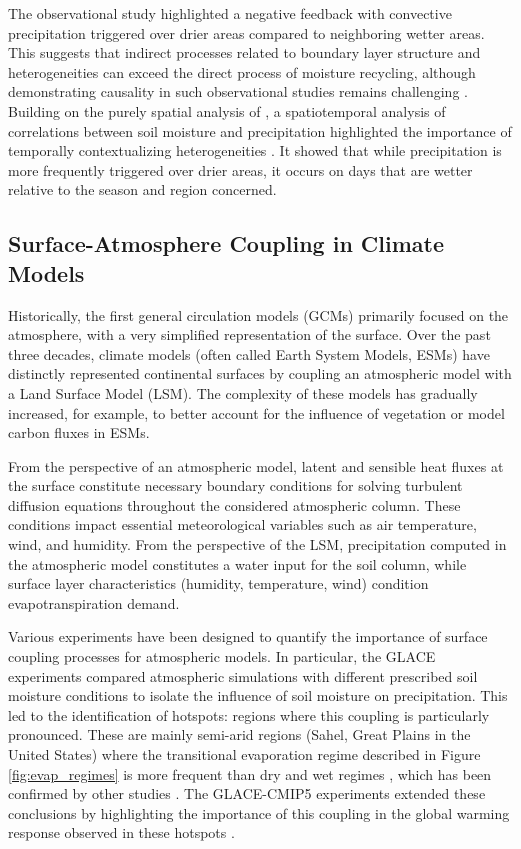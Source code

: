 The observational study \cite{taylor_afternoon_2012} highlighted a negative feedback with convective precipitation triggered over drier areas compared to neighboring wetter areas. This suggests that indirect processes related to boundary layer structure and heterogeneities can exceed the direct process of moisture recycling, although demonstrating causality in such observational studies remains challenging \cite{salvucci_investigating_2002, guillod_land-surface_2014}. Building on the purely spatial analysis of \cite{taylor_afternoon_2012}, a spatiotemporal analysis of correlations between soil moisture and precipitation highlighted the importance of temporally contextualizing heterogeneities \cite{guillod_reconciling_2015}. It showed that while precipitation is more frequently triggered over drier areas, it occurs on days that are wetter relative to the season and region concerned.

\subsection{Surface-Atmosphere Coupling in Climate Models}

Historically, the first general circulation models (GCMs) primarily focused on the atmosphere, with a very simplified representation of the surface. Over the past three decades, climate models (often called Earth System Models, ESMs) have distinctly represented continental surfaces by coupling an atmospheric model with a Land Surface Model (LSM). The complexity of these models has gradually increased, for example, to better account for the influence of vegetation or model carbon fluxes in ESMs.

From the perspective of an atmospheric model, latent and sensible heat fluxes at the surface constitute necessary boundary conditions for solving turbulent diffusion equations throughout the considered atmospheric column. These conditions impact essential meteorological variables such as air temperature, wind, and humidity. From the perspective of the LSM, precipitation computed in the atmospheric model constitutes a water input for the soil column, while surface layer characteristics (humidity, temperature, wind) condition evapotranspiration demand.

Various experiments have been designed to quantify the importance of surface coupling processes for atmospheric models. In particular, the GLACE experiments \cite{koster_glace_2006} compared atmospheric simulations with different prescribed soil moisture conditions to isolate the influence of soil moisture on precipitation. This led to the identification of hotspots: regions where this coupling is particularly pronounced. These are mainly semi-arid regions (Sahel, Great Plains in the United States) where the transitional evaporation regime described in Figure \ref{fig:evap_regimes} is more frequent than dry and wet regimes \citep{koster_regions_2004}, which has been confirmed by other studies \cite{dirmeyer_terrestrial_2011, zou_precipitation_2023}. The GLACE-CMIP5 experiments \cite{seneviratne_impact_2013} extended these conclusions by highlighting the importance of this coupling in the global warming response observed in these hotspots \cite{berg_interannual_2015}.

